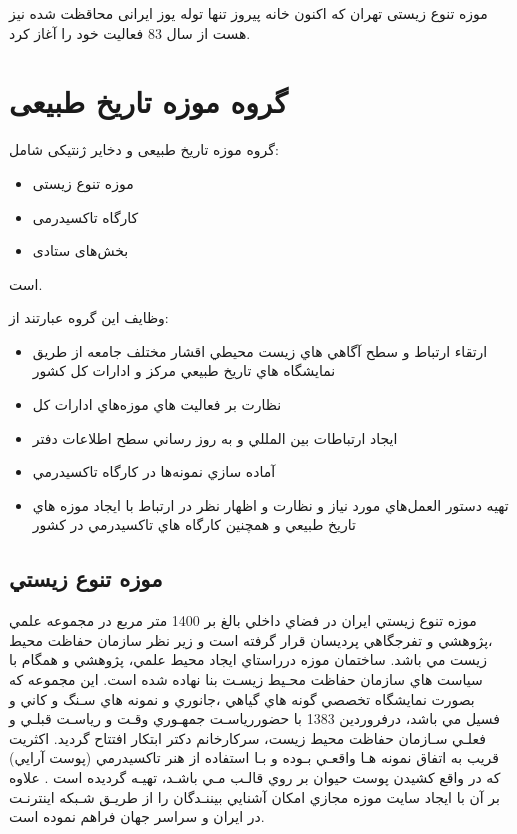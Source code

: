 موزه تنوع زیستی تهران که اکنون خانه پیروز تنها توله یوز ایرانی محاقظت شده نیز هست از سال 83 فعالیت خود را آغاز کرد. 


\section*{گروه موزه تاریخ طبیعی}
گروه موزه تاریخ طبیعی و دخایر ژنتیکی شامل:
\begin{itemize}
    \item موزه تنوع زیستی
    \item کارگاه تاکسیدرمی
    \item بخش‌های ستادی
\end{itemize}
است.

وظایف این گروه عبارتند از:

\begin{itemize}
    \item ارتقاء ارتباط و سطح آگاهي هاي زيست محيطي اقشار مختلف جامعه از طريق نمايشگاه
    هاي تاريخ طبيعي مركز و ادارات كل كشور
    \item نظارت بر فعاليت هاي موزه‌هاي ادارات كل
    \item ايجاد ارتباطات بين المللي و به روز رساني سطح اطلاعات دفتر
    \item آماده سازي نمونه‌ها در كارگاه تاكسيدرمي
    \item تهيه دستور العمل‌هاي مورد نياز و نظارت و اظهار نظر در ارتباط با ايجاد موزه هاي تاريخ
    طبيعي و همچنين كارگاه هاي تاكسيدرمي در كشور
\end{itemize}

\subsection*{موزه تنوع زيستي}
موزه تنوع زيستي ايران در فضاي داخلي بالغ بر 1400 متر مربع در مجموعه علمي ،پژوهشي و تفرجگاهي
پرديسان قرار گرفته است و زير نظر سازمان حفاظت محيط زيست مي باشد. 
ساختمان موزه درراستاي ايجاد محيط علمي، پژوهشي و همگام با سياست هاي سازمان حفاظت محـيط زيسـت
بنا نهاده شده است. اين مجموعه كه بصورت نمايشگاه تخصصي گونه هاي گياهي ،جانوري و نمونه هاي سـنگ و
كاني و فسيل مي باشد، درفروردين 1383 با حضوررياسـت جمهـوري وقـت و رياسـت قبلـي و فعلـي سـازمان
حفاظت محيط زيست، سركارخانم دكتر ابتكار افتتاح گرديد. اكثريت قريب به اتفاق نمونه هـا واقعـي بـوده و بـا
استفاده از هنر تاكسيدرمي (پوست آرايي) كه در واقع كشيدن پوست حيوان بر روي قالـب مـي باشـد، تهيـه
گرديده است . علاوه بر آن با ايجاد سايت موزه مجازي امكان آشنايي بيننـدگان را از طريـق شـبكه اينترنـت در
ايران و سراسر جهان فراهم نموده است.

